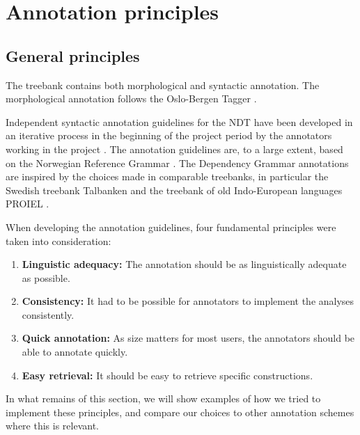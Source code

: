 \documentclass[10pt,a4paper]{article}
\begin{document}

\section{Annotation principles}
\subsection{General principles}


The treebank contains both morphological and syntactic annotation. The morphological annotation follows the Oslo-Bergen Tagger \cite{Hag:Joh:Nok:00,Sol:2013}.

Independent syntactic annotation guidelines for the NDT have been developed in an iterative process in the beginning of the project period by the annotators working in the project \cite{Kin:Sol:Eri:2013}. The annotation guidelines are, to a large extent, based on the Norwegian Reference Grammar \cite{Faa:Lie:Van:97}. The Dependency Grammar annotations are inspired by the choices made in comparable treebanks, in particular the Swedish treebank Talbanken \cite{Niv:Nil:Hal:2006} and the treebank of old Indo-European languages PROIEL \cite{Hau:Joh:Eck:Wel:Her:Mut:2009}.

When developing the annotation guidelines, four fundamental principles were taken into consideration:
\begin{enumerate}
 \item \textbf{Linguistic adequacy:} The annotation should be as linguistically adequate as possible.
 \item \textbf{Consistency:} It had to be possible for annotators to implement the analyses consistently.
 \item \textbf{Quick annotation:} As size matters for most users, the annotators should be able to annotate quickly.
 \item \textbf{Easy retrieval:} It should be easy to retrieve specific constructions.
\end{enumerate}
In what remains of this section, we will show examples of how we tried to implement these principles, and compare our choices to other annotation schemes where this is relevant.
\end{document}
